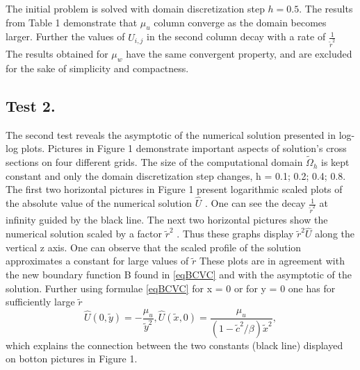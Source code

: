 \documentclass[12pt]{article}
\theoremstyle{theorem}
\theoremstyle{defi}
\begin{document}
The initial problem is solved with domain discretization step $h = 0.5$. The results from Table 1 demonstrate that $\mu_u$  column converge as the domain becomes larger. Further the values of $\widehat{U}_{i,j}$   in the second column decay with a rate of $\frac{1}{\tilde r^2}$  The results obtained for  $\mu_w$  have the same convergent property, and are excluded for the sake of simplicity and compactness.

\subsection{Test 2.}
The second test reveals the asymptotic of the numerical solution presented in log-log plots. Pictures in Figure 1 demonstrate important aspects of solution's cross sections on four different grids. The size of the computational domain $\tilde \Omega_h$   is kept constant and only the domain discretization step changes, h = 0.1; 0.2; 0.4; 0.8. 
The first two horizontal pictures in Figure 1 present logarithmic scaled plots of the absolute value of the numerical solution $\widehat{U}$  . One can see the decay $\frac{1}{\tilde r^2}$  at infinity guided by the black line. The next two horizontal pictures show the numerical solution scaled by a factor $\tilde r^2$  . Thus these graphs display  $\tilde r^2\widehat{U}$  along the vertical z axis. One can observe that the scaled profile of the solution approximates a constant for large values of $ \tilde r$  These plots are in agreement with the new boundary function B found in \ref{eqBCVC} and with the asymptotic of the solution. Further using formulae \ref{eqBCVC}  for x = 0 or for y = 0 one has for sufficiently large $ \tilde r $
$$
\widehat{U}(0,\tilde y) = - \frac{\mu_u}{\tilde y^2}, \widehat{U}(\tilde x,0) = \frac{\mu_u}{(1 - \tilde c^2/\beta )\tilde x^2},
$$
which explains the connection between the two constants (black line) displayed on botton pictures in Figure 1.
\end{document}
